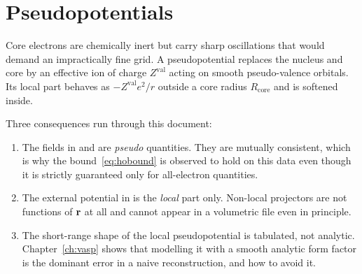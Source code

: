 \section{Pseudopotentials}

Core electrons are chemically inert but carry sharp oscillations that would
demand an impractically fine grid. A pseudopotential replaces the nucleus and
core by an effective ion of charge $Z^{\mathrm{val}}$ acting on smooth
pseudo-valence orbitals. Its local part behaves as
$-Z^{\mathrm{val}}e^2/r$ outside a core radius $R_{\mathrm{core}}$ and is
softened inside.

Three consequences run through this document:

\begin{enumerate}
  \item The fields in  and  are
    \emph{pseudo} quantities. They are mutually consistent, which is why the
    bound~\eqref{eq:hobound} is observed to hold on this data even though it is
    strictly guaranteed only for all-electron quantities.
  \item The external potential in  is the \emph{local} part only.
    Non-local projectors are not functions of $\mathbf{r}$ at all and cannot appear in
    a volumetric file even in principle.
  \item The short-range shape of the local pseudopotential is tabulated, not
    analytic. Chapter~\ref{ch:vasp} shows that modelling it with a smooth
    analytic form factor is the dominant error in a naive reconstruction, and
    how to avoid it.
\end{enumerate}

